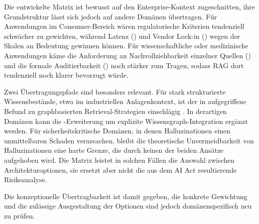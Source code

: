 Die entwickelte Matrix ist bewusst auf den Enterprise-Kontext zugeschnitten, ihre Grundstruktur lässt sich jedoch auf andere Domänen übertragen. Für Anwendungen im Consumer-Bereich wären regulatorische Kriterien tendenziell schwächer zu gewichten, während Latenz () und Vendor Lock-in () wegen der Skalen an Bedeutung gewinnen können. Für wissenschaftliche oder medizinische Anwendungen käme die Anforderung an Nachvollziehbarkeit einzelner Quellen () und die formale Auditierbarkeit () noch stärker zum Tragen, sodass RAG dort tendenziell noch klarer bevorzugt würde.

Zwei Übertragungspfade sind besonders relevant. Für stark strukturierte Wissensbestände, etwa im industriellen Anlagenkontext, ist der in  aufgegriffene Befund zu graphbasierten Retrieval-Strategien einschlägig \autocite[17]{Karakurt.2026}. In derartigen Domänen kann die -Erweiterung um explizite Wissensgraph-Integration ergänzt werden. Für sicherheitskritische Domänen, in denen Halluzinationen einen unmittelbaren Schaden verursachen, bleibt die theoretische Unvermeidbarkeit von Halluzinationen \autocite[1]{Xu.2025} eine harte Grenze, die durch keinen der beiden Ansätze aufgehoben wird. Die Matrix leistet in solchen Fällen die Auswahl zwischen Architekturoptionen, sie ersetzt aber nicht die aus dem AI Act resultierende Risikoanalyse.

Die konzeptionelle Übertragbarkeit ist damit gegeben, die konkrete Gewichtung und die zulässige Ausgestaltung der Optionen sind jedoch domänenspezifisch neu zu prüfen.
